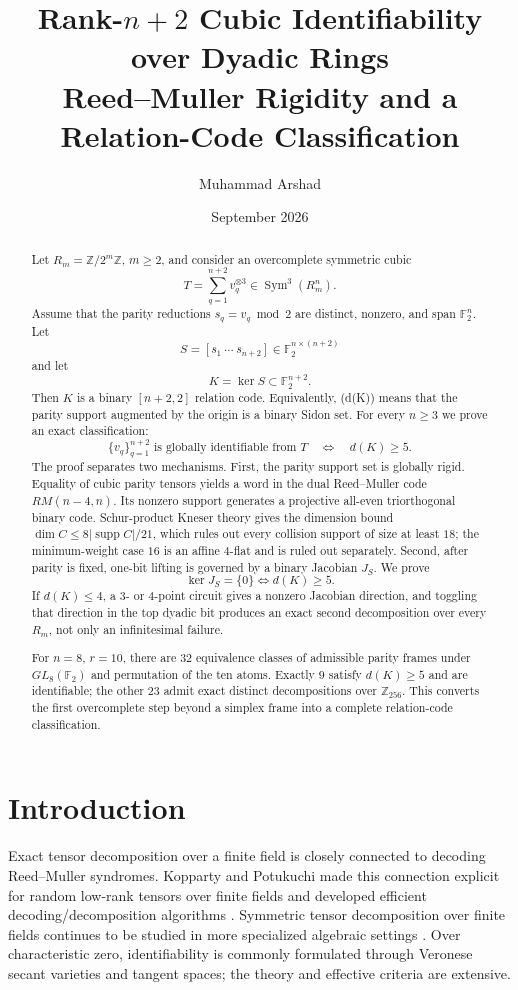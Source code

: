\documentclass[11pt]{article}
\title{\textbf{Rank-\(n+2\) Cubic Identifiability over Dyadic Rings}\\
Reed--Muller Rigidity and a Relation-Code Classification}
\author{Muhammad Arshad}
\date{September 2026}
\theoremstyle{definition}
\newcommand{\F}{\mathbb F}
\newcommand{\Z}{\mathbb Z}
\newcommand{\Sym}{\operatorname{Sym}}
\begin{document}
\maketitle

\begin{abstract}
Let \(R_m=\Z/2^m\Z\), \(m\ge2\), and consider an overcomplete symmetric cubic
\[
T=\sum_{q=1}^{n+2}v_q^{\otimes3}\in\Sym^3(R_m^n).
\]
Assume that the parity reductions \(s_q=v_q\bmod2\) are distinct, nonzero, and span \(\F_2^n\). Let
\[
S=[s_1\ \cdots\ s_{n+2}]\in\F_2^{n\times(n+2)}
\]
and let
\[
K=\ker S\subset\F_2^{n+2}.
\]
Then \(K\) is a binary \([n+2,2]\) relation code. Equivalently, (d(K)) means that the parity support augmented by the origin is a binary Sidon set. For every \(n\ge3\) we prove an exact classification:
\[
\boxed{\quad
\{v_q\}_{q=1}^{n+2}\text{ is globally identifiable from }T
\quad\Longleftrightarrow\quad
d(K)\ge5.
\quad}
\]
The proof separates two mechanisms. First, the parity support set is globally rigid. Equality of cubic parity tensors yields a word in the dual Reed--Muller code \(RM(n-4,n)\). Its nonzero support generates a projective all-even triorthogonal binary code. Schur-product Kneser theory gives the dimension bound \(\dim C\le 8|\operatorname{supp}C|/21\), which rules out every collision support of size at least \(18\); the minimum-weight case \(16\) is an affine \(4\)-flat and is ruled out separately. Second, after parity is fixed, one-bit lifting is governed by a binary Jacobian \(J_S\). We prove
\[
\ker J_S=\{0\}\Longleftrightarrow d(K)\ge5.
\]
If \(d(K)\le4\), a \(3\)- or \(4\)-point circuit gives a nonzero Jacobian direction, and toggling that direction in the top dyadic bit produces an exact second decomposition over every \(R_m\), not only an infinitesimal failure.

For \(n=8\), \(r=10\), there are \(32\) equivalence classes of admissible parity frames under \(GL_8(\F_2)\) and permutation of the ten atoms. Exactly \(9\) satisfy \(d(K)\ge5\) and are identifiable; the other \(23\) admit exact distinct decompositions over \(\Z_{256}\). This converts the first overcomplete step beyond a simplex frame into a complete relation-code classification.
\end{abstract}

\section{Introduction}
Exact tensor decomposition over a finite field is closely connected to decoding Reed--Muller syndromes. Kopparty and Potukuchi made this connection explicit for random low-rank tensors over finite fields and developed efficient decoding/decomposition algorithms \cite{KoppartyPotukuchi2018}. Symmetric tensor decomposition over finite fields continues to be studied in more specialized algebraic settings \cite{CotardoZullo2026}. Over characteristic zero, identifiability is commonly formulated through Veronese secant varieties and tangent spaces; the theory and effective criteria are extensive.
\end{document}
